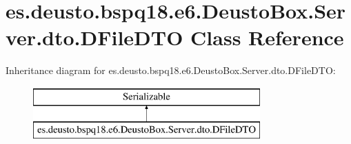 \hypertarget{classes_1_1deusto_1_1bspq18_1_1e6_1_1_deusto_box_1_1_server_1_1dto_1_1_d_file_d_t_o}{}\section{es.\+deusto.\+bspq18.\+e6.\+Deusto\+Box.\+Server.\+dto.\+D\+File\+D\+TO Class Reference}
\label{classes_1_1deusto_1_1bspq18_1_1e6_1_1_deusto_box_1_1_server_1_1dto_1_1_d_file_d_t_o}
Inheritance diagram for es.\+deusto.\+bspq18.\+e6.\+Deusto\+Box.\+Server.\+dto.\+D\+File\+D\+TO\+:\begin{figure}[H]
\begin{center}
\leavevmode
\includegraphics[height=2.000000cm]{classes_1_1deusto_1_1bspq18_1_1e6_1_1_deusto_box_1_1_server_1_1dto_1_1_d_file_d_t_o}
\end{center}
\end{figure}

